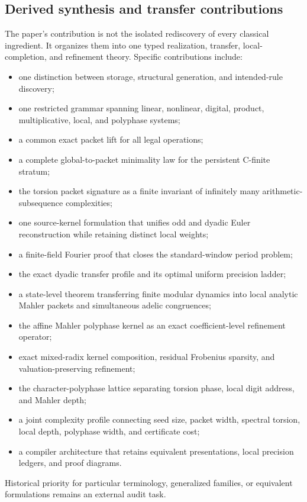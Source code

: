 \documentclass[11pt]{article}
\theoremstyle{definition}\newtheorem{definition}[theorem]{Definition}\newtheorem{example}[theorem]{Example}\newtheorem{construction}[theorem]{Construction}\newtheorem{algorithm}[theorem]{Algorithm}\newtheorem{conjecture}[theorem]{Conjecture}\newtheorem{problem}[theorem]{Problem}
\theoremstyle{remark}\newtheorem{remark}[theorem]{Remark}\newtheorem{boundary}[theorem]{Boundary}\newtheorem{certificate}[theorem]{Computational Certificate}\newtheorem{classical}[theorem]{Classical Input}\newtheorem{principle}[theorem]{Structural Principle}
\begin{document}
\subsection{Derived synthesis and transfer contributions}
The paper's contribution is not the isolated rediscovery of every classical ingredient. It organizes them into one typed realization, transfer, local-completion, and refinement theory. Specific contributions include:
\begin{itemize}
\item one distinction between storage, structural generation, and intended-rule discovery;
\item one restricted grammar spanning linear, nonlinear, digital, product, multiplicative, local, and polyphase systems;
\item a common exact packet lift for all legal operations;
\item a complete global-to-packet minimality law for the persistent C-finite stratum;
\item the torsion packet signature as a finite invariant of infinitely many arithmetic-subsequence complexities;
\item one source-kernel formulation that unifies odd and dyadic Euler reconstruction while retaining distinct local weights;
\item a finite-field Fourier proof that closes the standard-window period problem;
\item the exact dyadic transfer profile and its optimal uniform precision ladder;
\item a state-level theorem transferring finite modular dynamics into local analytic Mahler packets and simultaneous adelic congruences;
\item the affine Mahler polyphase kernel as an exact coefficient-level refinement operator;
\item exact mixed-radix kernel composition, residual Frobenius sparsity, and valuation-preserving refinement;
\item the character-polyphase lattice separating torsion phase, local digit address, and Mahler depth;
\item a joint complexity profile connecting seed size, packet width, spectral torsion, local depth, polyphase width, and certificate cost;
\item a compiler architecture that retains equivalent presentations, local precision ledgers, and proof diagrams.
\end{itemize}
Historical priority for particular terminology, generalized families, or equivalent formulations remains an external audit task.
\end{document}
